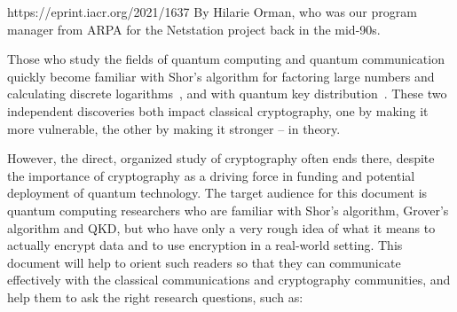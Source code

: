 



https://eprint.iacr.org/2021/1637
By Hilarie Orman, who was our program manager from ARPA for the Netstation project back in the mid-90s.

Those who study the fields of quantum computing and quantum
communication quickly become familiar with Shor's algorithm for
factoring large numbers and calculating discrete
logarithms~\cite{shor:siam-factor}, and with quantum key
distribution~\cite{bennett:bb84,PhysRevLett.68.557,ekert1991qcb,PhysRevLett.108.130503,xu2015measurement,Vazirani:2019:FDI:3321370.3310974,RevModPhys.81.1301,PhysRevLett.85.441}.
These two independent discoveries both impact classical cryptography,
one by making it more vulnerable, the other by making it stronger --
in theory.

However, the direct, organized study of cryptography often ends there,
despite the importance of cryptography as a driving force in funding
and potential deployment of quantum technology.  The target audience
for this document is quantum computing researchers who are familiar
with Shor's algorithm, Grover's algorithm and QKD, but who have only a
very rough idea of what it means to actually encrypt data and to use
encryption in a real-world setting.  This document will help to orient
such readers so that they can communicate effectively with the
classical communications and cryptography communities, and help them
to ask the right research questions, such as:

